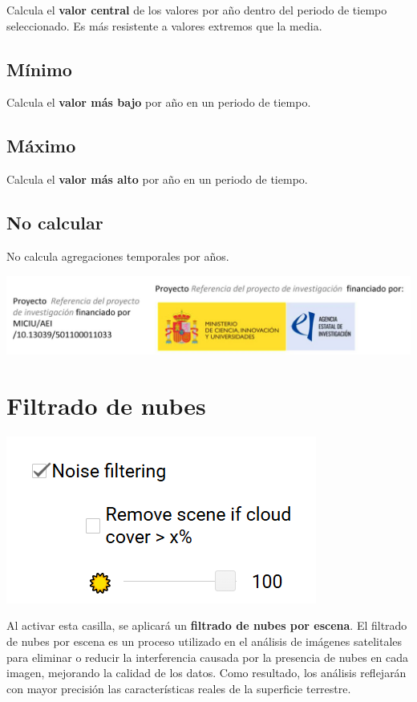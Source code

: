 \documentclass[
]{book}
\begin{document}
Calcula el \textbf{valor central} de los valores por año dentro del periodo de tiempo seleccionado. Es más resistente a valores extremos que la media.

\section{\texorpdfstring{\textbf{Mínimo}}{Mínimo}}\label{muxednimo-1}

Calcula el \textbf{valor más bajo} por año en un periodo de tiempo.

\section{\texorpdfstring{\textbf{Máximo}}{Máximo}}\label{muxe1ximo-1}

Calcula el \textbf{valor más alto} por año en un periodo de tiempo.

\section{\texorpdfstring{\textbf{No calcular}}{No calcular}}\label{no-calcular}

No calcula agregaciones temporales por años.

\includegraphics{assets/logo.jpeg}

\chapter{Filtrado de nubes}\label{filtrado-nubes}

\includegraphics{assets/filter.png}

Al activar esta casilla, se aplicará un \textbf{filtrado de nubes por escena}. El filtrado de nubes por escena es un proceso utilizado en el análisis de imágenes satelitales para eliminar o reducir la interferencia causada por la presencia de nubes en cada imagen, mejorando la calidad de los datos. Como resultado, los análisis reflejarán con mayor precisión las características reales de la superficie terrestre.
\end{document}
